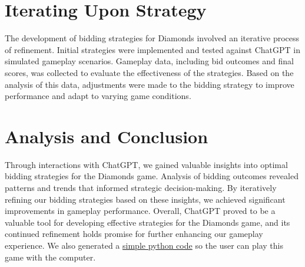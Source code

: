 \documentclass{article}
\begin{document}
\section{Iterating Upon Strategy}
The development of bidding strategies for Diamonds involved an iterative process of refinement. Initial strategies were implemented and tested against ChatGPT in simulated gameplay scenarios. Gameplay data, including bid outcomes and final scores, was collected to evaluate the effectiveness of the strategies. Based on the analysis of this data, adjustments were made to the bidding strategy to improve performance and adapt to varying game conditions.

\section{Analysis and Conclusion}
Through interactions with ChatGPT, we gained valuable insights into optimal bidding strategies for the Diamonds game. Analysis of bidding outcomes revealed patterns and trends that informed strategic decision-making. By iteratively refining our bidding strategies based on these insights, we achieved significant improvements in gameplay performance. Overall, ChatGPT proved to be a valuable tool for developing effective strategies for the Diamonds game, and its continued refinement holds promise for further enhancing our gameplay experience.
We also generated a \href{https://colab.research.google.com/drive/1_RaeWG4HaKHGiGgkrC30edglX2zf0qbu?usp=sharing}{simple python code} so the user can play this game with the computer.
\end{document}
